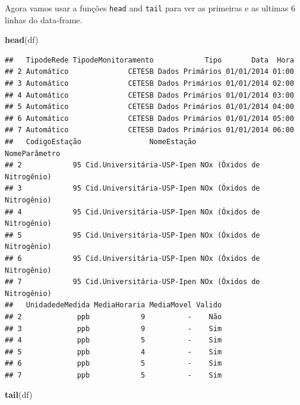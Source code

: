 \documentclass[]{book}
\newenvironment{Shaded}{\begin{snugshade}}{\end{snugshade}}
\newcommand{\KeywordTok}[1]{\textcolor[rgb]{0.13,0.29,0.53}{\textbf{#1}}}
\newcommand{\NormalTok}[1]{#1}
\theoremstyle{definition}
\theoremstyle{definition}
\theoremstyle{definition}
\theoremstyle{remark}
\begin{document}
Agora vamos usar a funções \texttt{head} and \texttt{tail} para ver as
primeiras e as ultimas 6 linhas do data-frame.

\begin{Shaded}
\begin{Highlighting}[]
\KeywordTok{head}\NormalTok{(df)}
\end{Highlighting}
\end{Shaded}

\begin{verbatim}
##   TipodeRede TipodeMonitoramento            Tipo       Data  Hora
## 2 Automático              CETESB Dados Primários 01/01/2014 01:00
## 3 Automático              CETESB Dados Primários 01/01/2014 02:00
## 4 Automático              CETESB Dados Primários 01/01/2014 03:00
## 5 Automático              CETESB Dados Primários 01/01/2014 04:00
## 6 Automático              CETESB Dados Primários 01/01/2014 05:00
## 7 Automático              CETESB Dados Primários 01/01/2014 06:00
##   CodigoEstação                NomeEstação              NomeParâmetro
## 2            95 Cid.Universitária-USP-Ipen NOx (Óxidos de Nitrogênio)
## 3            95 Cid.Universitária-USP-Ipen NOx (Óxidos de Nitrogênio)
## 4            95 Cid.Universitária-USP-Ipen NOx (Óxidos de Nitrogênio)
## 5            95 Cid.Universitária-USP-Ipen NOx (Óxidos de Nitrogênio)
## 6            95 Cid.Universitária-USP-Ipen NOx (Óxidos de Nitrogênio)
## 7            95 Cid.Universitária-USP-Ipen NOx (Óxidos de Nitrogênio)
##   UnidadedeMedida MediaHoraria MediaMovel Valido
## 2             ppb            9          -    Não
## 3             ppb            9          -    Sim
## 4             ppb            5          -    Sim
## 5             ppb            4          -    Sim
## 6             ppb            5          -    Sim
## 7             ppb            5          -    Sim
\end{verbatim}

\begin{Shaded}
\begin{Highlighting}[]
\KeywordTok{tail}\NormalTok{(df)}
\end{Highlighting}
\end{Shaded}
\end{document}
